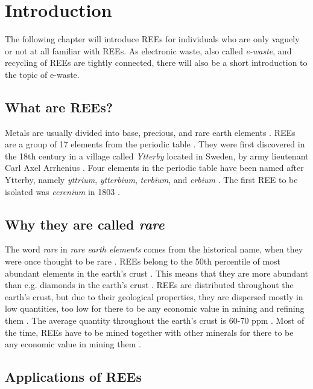 
\section{Introduction}
The following chapter will introduce REEs for individuals who are only vaguely or not at all familiar with REEs. As electronic waste, also called \textit{e-waste}, and recycling of REEs are tightly connected, there will also be a short introduction to the topic of e-waste. 

\subsection{What are REEs?}

Metals are usually divided into base, precious, and rare earth elements \cite{javed2024}. REEs are a group of 17 elements from the periodic table \cite{USDoE2024}. They were first discovered in the 18th century in a village called \textit{Ytterby} located in Sweden, by army lieutenant Carl Axel Arrhenius \cite{britannica2024}. Four elements in the periodic table have been named after Ytterby, namely \textit{yttrium}, \textit{ytterbium}, \textit{terbium}, and \textit{erbium} \cite{sciencehistory2024}. The first REE to be isolated was \textit{cerenium} in 1803 \cite{britannica2024}.  

\subsection{Why they are called \textit{rare}}

The word \textit{rare} in \textit{rare earth elements} comes from the historical name, when they were once thought to be rare \cite{sciencehistory2024}. REEs belong to the 50th percentile of most abundant elements in the earth's crust \cite{britannica2024}. This means that they are more abundant than e.g. diamonds in the earth's crust \cite{diamonds}. REEs are distributed throughout the earth's crust, but due to their geological properties, they are dispersed mostly in low quantities, too low for there to be any economic value in mining and refining them \cite{REEDistribution}. The average quantity throughout the earth's crust is 60-70 ppm \cite{REEDistribution}. Most of the time, REEs have to be mined together with other minerals for there to be any economic value in mining them \cite{REEDistribution}. 

\subsection{Applications of REEs}

